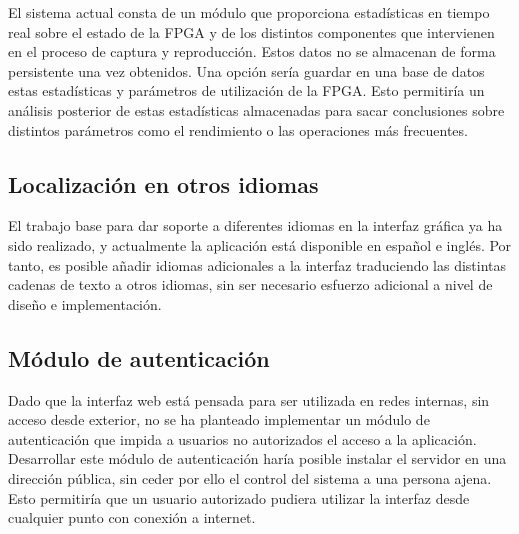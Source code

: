 El sistema actual consta de un módulo que proporciona estadísticas en tiempo real sobre el estado de la \gls{FPGA} y de los distintos componentes que intervienen en el proceso de captura y reproducción. Estos datos no se almacenan de forma persistente una vez obtenidos. Una opción sería guardar en una base de datos estas estadísticas y parámetros de utilización de la \gls{FPGA}. Esto permitiría un análisis posterior de estas estadísticas almacenadas para sacar conclusiones sobre distintos parámetros como el rendimiento o las operaciones más frecuentes.


\subsection*{Localización en otros idiomas}

El trabajo base para dar soporte a diferentes idiomas en la interfaz gráfica ya ha sido realizado, y actualmente la aplicación está disponible en español e inglés. Por tanto, es posible añadir idiomas adicionales a la interfaz traduciendo las distintas cadenas de texto a otros idiomas, sin ser necesario esfuerzo adicional a nivel de diseño e implementación.


\subsection*{Módulo de autenticación}


Dado que la interfaz web está pensada para ser utilizada en redes internas, sin acceso desde exterior, no se ha planteado implementar un módulo de autenticación que impida a usuarios no autorizados el acceso a la aplicación. Desarrollar este módulo de autenticación haría posible instalar el servidor en una dirección pública, sin ceder por ello el control del sistema a una persona ajena. Esto permitiría que un usuario autorizado pudiera utilizar la interfaz desde cualquier punto con conexión a internet.